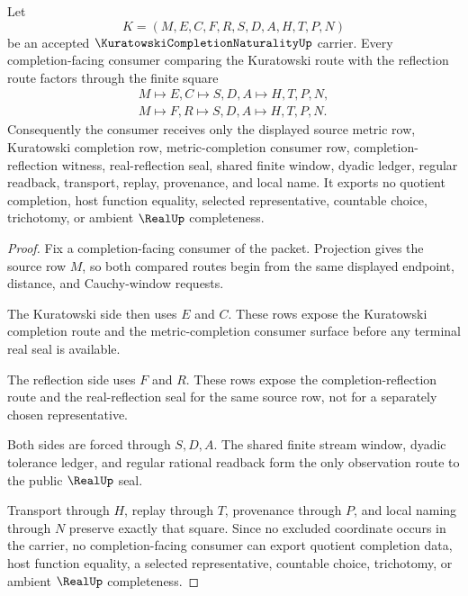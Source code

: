 \begin{theorem}
\label{thm:kuratowski-completion-naturality-square}
Let
$$
K=(M,E,C,F,R,S,D,A,H,T,P,N)
$$
be an accepted $\KuratowskiCompletionNaturalityUp$ carrier. Every completion-facing consumer comparing the Kuratowski route with the reflection route factors through the finite square
$$
\begin{gathered}
M \longmapsto E,C \longmapsto S,D,A \longmapsto H,T,P,N,\\
M \longmapsto F,R \longmapsto S,D,A \longmapsto H,T,P,N .
\end{gathered}
$$
Consequently the consumer receives only the displayed source metric row, Kuratowski completion row, metric-completion consumer row, completion-reflection witness, real-reflection seal, shared finite window, dyadic ledger, regular readback, transport, replay, provenance, and local name. It exports no quotient completion, host function equality, selected representative, countable choice, trichotomy, or ambient $\RealUp$ completeness.
\end{theorem}
\begin{proof}
Fix a completion-facing consumer of the packet. Projection gives the source row $M$, so both compared routes begin from the same displayed endpoint, distance, and Cauchy-window requests.

The Kuratowski side then uses $E$ and $C$. These rows expose the Kuratowski completion route and the metric-completion consumer surface before any terminal real seal is available.

The reflection side uses $F$ and $R$. These rows expose the completion-reflection route and the real-reflection seal for the same source row, not for a separately chosen representative.

Both sides are forced through $S,D,A$. The shared finite stream window, dyadic tolerance ledger, and regular rational readback form the only observation route to the public $\RealUp$ seal.

Transport through $H$, replay through $T$, provenance through $P$, and local naming through $N$ preserve exactly that square. Since no excluded coordinate occurs in the carrier, no completion-facing consumer can export quotient completion data, host function equality, a selected representative, countable choice, trichotomy, or ambient $\RealUp$ completeness.
\end{proof}



